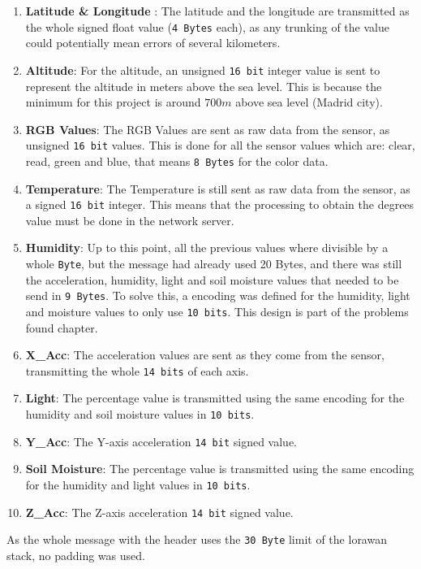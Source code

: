 \begin{enumerate}
    \item \textbf{Latitude \& Longitude }: The latitude and the longitude are transmitted as the whole signed float value (\texttt{4 Bytes} each), as any trunking of the value could potentially mean errors of several kilometers.
    \item \textbf{Altitude}: For the altitude, an unsigned \texttt{16 bit} integer value is sent to represent the altitude in meters above the sea level. This is because the minimum for this project is around $700m$ above sea level (Madrid city).
    \item \textbf{RGB Values}: The RGB Values are sent as raw data from the sensor, as unsigned \texttt{16 bit} values. This is done for all the sensor values which are: clear, read, green and blue, that means \texttt{8 Bytes} for the color data.
    \item \textbf{Temperature}: The Temperature is still sent as raw data from the sensor, as a signed \texttt{16 bit} integer. This means that the processing to obtain the degrees value must be done in the network server.
    \item \textbf{Humidity}: Up to this point, all the previous values where divisible by a whole \texttt{Byte}, but the message had already used 20 Bytes, and there was still the acceleration, humidity, light and soil moisture values that needed to be 
    send in \texttt{9 Bytes}. To solve this, a encoding was defined for the humidity, light and moisture values to only use \texttt{10 bits}. This design is part of the problems found chapter.
    \item \textbf{X\_Acc}: The acceleration values are sent as they come from the sensor, transmitting the whole \texttt{14 bits} of each axis.
    \item \textbf{Light}: The percentage value is transmitted using the same encoding for the humidity and soil moisture values in \texttt{10 bits}.
    \item \textbf{Y\_Acc}: The Y-axis acceleration \texttt{14 bit} signed value.
    \item \textbf{Soil Moisture}: The percentage value is transmitted using the same encoding for the humidity and light values in \texttt{10 bits}.
    \item \textbf{Z\_Acc}: The Z-axis acceleration \texttt{14 bit} signed value.
\end{enumerate}

As the whole message with the header uses the \texttt{30 Byte} limit of the \acrshort{lorawan} stack, no padding was used.

